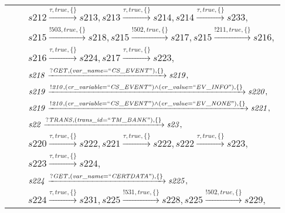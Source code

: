 \begin{tabular}{lcp{350px}}
\end{tabular}

\begin{tabular}{lcp{350px}}
\end{tabular}

\begin{tabular}{lcp{350px}}
& & $\mathit{s212}\xrightarrow{\mathit{\tau}, \mathit{true}, \{\}}\mathit{s213},\mathit{s213}\xrightarrow{\mathit{\tau}, \mathit{true}, \{\}}\mathit{s214},\mathit{s214}\xrightarrow{\mathit{\tau}, \mathit{true}, \{\}}\mathit{s233},$ \\
& & $\mathit{s215}\xrightarrow{\mathit{!503}, \mathit{true}, \{\}}\mathit{s218},\mathit{s215}\xrightarrow{\mathit{!502}, \mathit{true}, \{\}}\mathit{s217},\mathit{s215}\xrightarrow{\mathit{!211}, \mathit{true}, \{\}}\mathit{s216},$ \\
& & $\mathit{s216}\xrightarrow{\mathit{\tau}, \mathit{true}, \{\}}\mathit{s224},\mathit{s217}\xrightarrow{\mathit{\tau}, \mathit{true}, \{\}}\mathit{s223},$ \\
& & $\mathit{s218}\xrightarrow{\mathit{?GET}, \mathit{(var\_name = ``CS\_EVENT")}, \{\}}\mathit{s219},$ \\
& & $\mathit{s219}\xrightarrow{\mathit{!210}, \mathit{(cr\_variable = ``CS\_EVENT") \land (cr\_value = ``EV\_INFO")}, \{\}}\mathit{s220},$ \\
& & $\mathit{s219}\xrightarrow{\mathit{!210}, \mathit{(cr\_variable = ``CS\_EVENT") \land (cr\_value = ``EV\_NONE")}, \{\}}\mathit{s221},$ \\
& & $\mathit{s22}\xrightarrow{\mathit{?TRANS}, \mathit{(trans\_id = ``TM\_BANK")}, \{\}}\mathit{s23},$ \\
& & $\mathit{s220}\xrightarrow{\mathit{\tau}, \mathit{true}, \{\}}\mathit{s222},\mathit{s221}\xrightarrow{\mathit{\tau}, \mathit{true}, \{\}}\mathit{s222},\mathit{s222}\xrightarrow{\mathit{\tau}, \mathit{true}, \{\}}\mathit{s223},$ \\
& & $\mathit{s223}\xrightarrow{\mathit{\tau}, \mathit{true}, \{\}}\mathit{s224},$ \\
& & $\mathit{s224}\xrightarrow{\mathit{?GET}, \mathit{(var\_name = ``CERTDATA")}, \{\}}\mathit{s225},$ \\
& & $\mathit{s224}\xrightarrow{\mathit{\tau}, \mathit{true}, \{\}}\mathit{s231},\mathit{s225}\xrightarrow{\mathit{!531}, \mathit{true}, \{\}}\mathit{s228},\mathit{s225}\xrightarrow{\mathit{!502}, \mathit{true}, \{\}}\mathit{s229},$ \\

\end{tabular}
